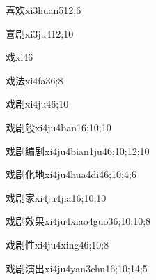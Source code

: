 \begin{verbete}{喜欢}{xi3huan5}{12;6}
\end{verbete}

\begin{verbete}{喜剧}{xi3ju4}{12;10}
\end{verbete}

\begin{verbete}{戏}{xi4}{6}
\end{verbete}

\begin{verbete}{戏法}{xi4fa3}{6;8}
\end{verbete}

\begin{verbete}{戏剧}{xi4ju4}{6;10}
\end{verbete}

\begin{verbete}{戏剧般}{xi4ju4ban1}{6;10;10}
\end{verbete}

\begin{verbete}{戏剧编剧}{xi4ju4bian1ju4}{6;10;12;10}
\end{verbete}

\begin{verbete}{戏剧化地}{xi4ju4hua4di4}{6;10;4;6}
\end{verbete}

\begin{verbete}{戏剧家}{xi4ju4jia1}{6;10;10}
\end{verbete}

\begin{verbete}{戏剧效果}{xi4ju4xiao4guo3}{6;10;10;8}
\end{verbete}

\begin{verbete}{戏剧性}{xi4ju4xing4}{6;10;8}
\end{verbete}

\begin{verbete}{戏剧演出}{xi4ju4yan3chu1}{6;10;14;5}
\end{verbete}

